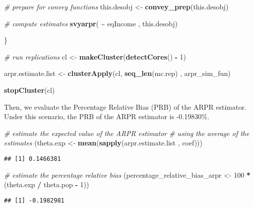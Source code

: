 \documentclass[
]{book}
\newenvironment{Shaded}{\begin{snugshade}}{\end{snugshade}}
\newcommand{\CommentTok}[1]{\textcolor[rgb]{0.56,0.35,0.01}{\textit{#1}}}
\newcommand{\DecValTok}[1]{\textcolor[rgb]{0.00,0.00,0.81}{#1}}
\newcommand{\FunctionTok}[1]{\textcolor[rgb]{0.13,0.29,0.53}{\textbf{#1}}}
\newcommand{\NormalTok}[1]{#1}
\newcommand{\OtherTok}[1]{\textcolor[rgb]{0.56,0.35,0.01}{#1}}
\newcommand{\SpecialCharTok}[1]{\textcolor[rgb]{0.81,0.36,0.00}{\textbf{#1}}}
\begin{document}
\begin{Shaded}
\begin{Highlighting}[]
  \CommentTok{\# prepare for convey functions}
\NormalTok{  this.desobj }\OtherTok{\textless{}{-}} \FunctionTok{convey\_prep}\NormalTok{(this.desobj)}
  
  \CommentTok{\# compute estimates}
  \FunctionTok{svyarpr}\NormalTok{( }\SpecialCharTok{\textasciitilde{}}\NormalTok{ eqIncome , this.desobj)}
  
\NormalTok{\}}

\CommentTok{\# run replications}
\NormalTok{cl }\OtherTok{\textless{}{-}} \FunctionTok{makeCluster}\NormalTok{(}\FunctionTok{detectCores}\NormalTok{() }\SpecialCharTok{{-}} \DecValTok{1}\NormalTok{)}

\NormalTok{arpr.estimate.list }\OtherTok{\textless{}{-}}
  \FunctionTok{clusterApply}\NormalTok{(cl, }\FunctionTok{seq\_len}\NormalTok{(mc.rep) , arpr\_sim\_fun)}

\FunctionTok{stopCluster}\NormalTok{(cl)}
\end{Highlighting}
\end{Shaded}

Then, we evaluate the Percentage Relative Bias (PRB) of the ARPR estimator. Under this scenario, the PRB of the ARPR estimator is -0.19830\%.

\begin{Shaded}
\begin{Highlighting}[]
\CommentTok{\# estimate the expected value of the ARPR estimator}
\CommentTok{\# using the average of the estimates}
\NormalTok{(theta.exp }\OtherTok{\textless{}{-}} \FunctionTok{mean}\NormalTok{(}\FunctionTok{sapply}\NormalTok{(arpr.estimate.list , coef)))}
\end{Highlighting}
\end{Shaded}

\begin{verbatim}
## [1] 0.1466381
\end{verbatim}

\begin{Shaded}
\begin{Highlighting}[]
\CommentTok{\# estimate the percentage relative bias}
\NormalTok{(percentage\_relative\_bias\_arpr }\OtherTok{\textless{}{-}} \DecValTok{100} \SpecialCharTok{*}\NormalTok{ (theta.exp }\SpecialCharTok{/}\NormalTok{ theta.pop }\SpecialCharTok{{-}} \DecValTok{1}\NormalTok{))}
\end{Highlighting}
\end{Shaded}

\begin{verbatim}
## [1] -0.1982981
\end{verbatim}
\end{document}
